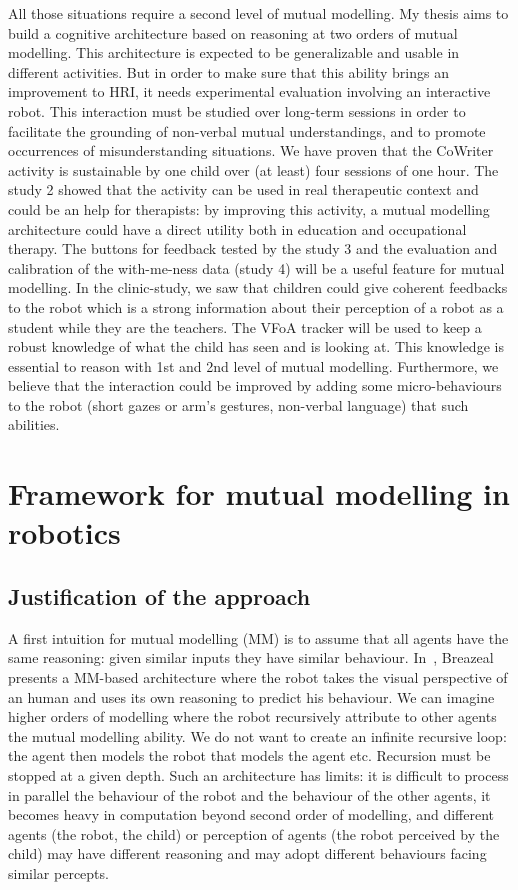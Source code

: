 \documentclass[10pt,a4paper]{article}
\begin{document}
All those situations require a second level of mutual modelling.
My thesis aims to build a cognitive architecture based on reasoning at two orders of mutual modelling. This architecture is expected to be generalizable and usable in different activities. But in order to make sure that this ability brings an improvement to HRI, it needs experimental evaluation involving an interactive robot. 
This interaction must be studied over long-term sessions in order to facilitate the grounding of non-verbal mutual understandings, and to promote occurrences of misunderstanding situations. 
We have proven that the CoWriter activity is sustainable by one child over (at least) four sessions of one hour. 
The study 2 showed that the activity can be used in real therapeutic context and could be an help for therapists: by improving this activity, a mutual modelling architecture could have a direct utility both in education and occupational therapy. 
The buttons for feedback tested by the study 3 and the evaluation and calibration of the with-me-ness data (study 4) will be a useful feature for mutual modelling. 
In the clinic-study, we saw that children could give coherent feedbacks to the robot which is a strong information about their perception of a robot as a student while they are the teachers. 
The VFoA tracker
 will be used to keep a robust knowledge of what the child has seen and is looking at. This knowledge is essential to reason with 1st and 2nd level of mutual modelling. Furthermore, we believe that the interaction could be improved by adding some micro-behaviours to the robot (short gazes or arm's gestures, non-verbal language) that such abilities.


\section{Framework for mutual modelling in robotics}\label{framework}
\subsection{Justification of the approach}

A first intuition for mutual modelling (MM) is to assume that all agents have the same reasoning: given similar inputs they have similar behaviour. In~\cite{breazeal2006using}, Breazeal presents a MM-based architecture where the robot takes the visual perspective of an human and uses its own reasoning to predict his behaviour. We can imagine higher orders of modelling where the robot recursively attribute to other agents the mutual modelling ability. We do not want to create an infinite recursive loop: the agent then models the robot that models the agent etc. Recursion must be stopped at a given depth. Such an architecture has limits: it is difficult to process in parallel the behaviour of the robot and the behaviour of the other agents, it becomes heavy in computation beyond second order of modelling, and different agents (the robot, the child) or perception of agents (the robot perceived by the child) may have different reasoning and may adopt different behaviours facing similar percepts. 
\end{document}
